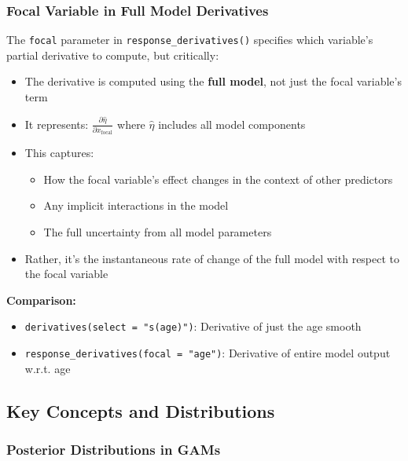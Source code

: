 \documentclass[11pt, a4paper]{article}
\begin{document}
\subsubsection{Focal Variable in Full Model Derivatives}

The \texttt{focal} parameter in \texttt{response\_derivatives()} specifies which variable's partial derivative to compute, but critically:

\begin{itemize}
\item The derivative is computed using the \textbf{full model}, not just the focal variable's term
\item It represents: $\frac{\partial \hat{\eta}}{\partial x_{\text{focal}}}$ where $\hat{\eta}$ includes all model components
\item This captures:
  \begin{itemize}
  \item How the focal variable's effect changes in the context of other predictors
  \item Any implicit interactions in the model
  \item The full uncertainty from all model parameters
  \end{itemize}
\item Rather, it's the instantaneous rate of change of the full model with respect to the focal variable
\end{itemize}

\textbf{Comparison:}
\begin{itemize}
\item \texttt{derivatives(select = "s(age)")}: Derivative of just the age smooth
\item \texttt{response\_derivatives(focal = "age")}: Derivative of entire model output w.r.t. age
\end{itemize}

\subsection{Key Concepts and Distributions}

\subsubsection{Posterior Distributions in GAMs}
\end{document}
